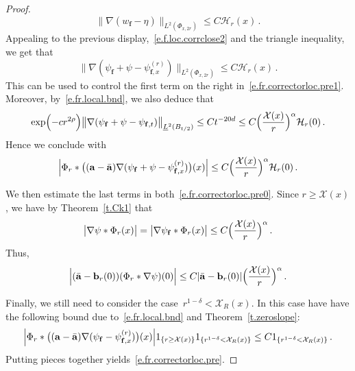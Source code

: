 \documentclass[11pt]{article} %
\numberwithin{equation}{section}
\theoremstyle{definition}
\renewcommand{\b}{\ensuremath{\mathbf{b}}}
\newcommand{\f}{\mathbf{f}}
\renewcommand{\a}{\mathbf{a}}
\newcommand{\ahom}{\bar{\a}}
\newcommand{\X}{\mathcal{X}}
\newcommand{\indc}{1}
\begin{document}
\begin{proof}
\begin{equation*}  
\big\| \nabla (w_\f - \eta)\big\|_{L^2(\Phi_{x,2r})} 
\leq 
C \mathcal{H}_r(x)
\,.
\end{equation*}
Appealing to the previous display,~\eqref{e.f.loc.corrclose2} and the triangle inequality, we get that 
\begin{equation*}  
\big\| \nabla (\psi_\f + \psi - \psi_{\f,x}^{(r)} )\big\|_{L^2(\Phi_{x,2r})}  
\leq 
C \mathcal{H}_r(x)
 \,.
\end{equation*}
This can be used to control the first term on the right in~\eqref{e.fr.correctorloc.pre1}. 
Moreover, by~\eqref{e.fr.local.bnd}, we also deduce that
\begin{equation*}  
 \exp\Bigl( - c r^{2\rho} \Bigr)\big\| \nabla (\psi_{\f}  + \psi -  \psi_{\f,t} )\big\|_{\underline{L}^2(B_{t/2})}  
 \leq 
 C t^{-20d} 
 \leq 
 C \Bigl( \frac{\X(x)}{r} \Bigr)^{\alpha}   \mathcal{H}_r(0) \,.
\end{equation*}
Hence we conclude with
\begin{equation*}  
\Bigl| 
\Phi_r \ast  \bigl(  (\a - \ahom) \nabla (\psi_{\f}  + \psi -  \psi_{\f,x}^{(r)})  \bigr)(x) 
\Bigr| 
\leq 
 C \Bigl( \frac{\X(x)}{r} \Bigr)^{\alpha}   \mathcal{H}_r(0)
 \,.
\end{equation*}

We then estimate the last terms in both~\eqref{e.fr.correctorloc.pre0}. Since $r \geq \X(x)$, we have by Theorem~\ref{t.Ck1} that 
\begin{equation*}  
\big| \nabla  \psi \ast \Phi_{r}(x)  \big|  
=
\big| \nabla \psi_\f \ast \Phi_{r}(x) \big| 
\leq 
C \Bigl( \frac{\X(x)}{r} \Bigr)^\alpha 
\,.
\end{equation*}
Thus,
\begin{equation*}  
\Bigl|  (\ahom - \b_{r}(0)) (\Phi_r \ast \nabla \psi)(0) \Bigr|  \leq C | \ahom - \b_{r}(0) | \Bigl( \frac{\X(x)}{r} \Bigr)^{\alpha} \,.
\end{equation*}

Finally, we still need to consider the case~$ r^{1-\delta} < \X_{R}(x)$. In this case have have the following bound due to~\eqref{e.fr.local.bnd} and Theorem~\ref{t.zeroslope}:
\begin{equation} 
\label{e.fr.correctorloc2}
\Bigl| 
\Phi_r \ast  \bigl(  (\a - \ahom) \nabla (\psi_{\f}  -  \psi_{\f,x}^{(r)})  \bigr)(x) 
\Bigr| \indc_{\{ r \geq \X(x)\} } \indc_{\{ r^{1-\delta} < \X_{R}(x) \}}
\leq 
C 
\indc_{\{ r^{1-\delta} < \X_{R}(x) \}}
\,.
\end{equation}
Putting pieces together yields~\eqref{e.fr.correctorloc.pre}. 





\end{proof}
\end{document}
